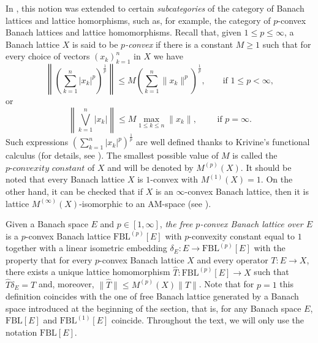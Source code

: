 \documentclass[11pt]{amsart}
\theoremstyle{definition}
\numberwithin{equation}{section}
\newcommand{\fbl}{\text{FBL}}
\begin{document}
In \cite{JLTTT}, this notion was extended to certain \textit{subcategories} of the category of Banach lattices and lattice homorphisms, such as, for example, the category of $p$-convex Banach lattices and lattice homomorphisms. Recall that, given $1\leq p\leq \infty$, a Banach lattice $X$ is said to be \emph{$p$-convex} if there is a constant $M\geq 1$ such that for every choice of vectors $(x_k)_{k=1}^n$ in $X$ we have
$$
\left\|\left(\sum_{k=1}^n|x_k|^p\right)^{\frac{1}{p}}\right\|\leq M\left(\sum_{k=1}^n\|x_k\|^p\right)^{\frac{1}{p}}, \qquad \text{if } 1\leq p<\infty,
$$
or
$$
\left\|\bigvee_{k=1}^n |x_k| \right\|\leq M \max_{1\leq k\leq n} \|x_k\|, \qquad \text{ if } p=\infty.
$$
Such expressions $\left(\sum_{k=1}^n|x_k|^p\right)^{\frac{1}{p}}$ are well defined thanks to Krivine's functional calculus (for details, see \cite[Section 1.d]{LT2-book}). The smallest possible value of $M$ is called the $\textit{$p$-convexity constant}$ of $X$ and will be denoted by $M^{(p)}(X)$. It should be noted that every Banach lattice $X$ is $1$-convex with $M^{(1)}(X)=1$. On the other hand, it can be checked that if $X$ is an $\infty$-convex Banach lattice, then it is lattice $M^{(\infty)}(X)$-isomorphic to an AM-space (see \cite[Theorem 2.1.12]{M-N-book}).  


Given a Banach space $E$ and $p\in[1,\infty]$, \textit{the free $p$-convex Banach lattice over $E$} is a $p$-convex Banach lattice $\fbl^{(p)}[E]$ with $p$-convexity constant equal to $1$ together with a linear isometric embedding $\delta_E:E\to \fbl^{(p)}[E]$ with the property that for every $p$-convex Banach lattice $X$ and every operator $T:E\to X$, there exists a unique lattice homomorphism $\widehat{T}:\fbl^{(p)}[E]\to X$ such that $\widehat{T}\delta_E=T$ and, moreover, $\|\widehat{T}\|\leq M^{(p)}(X)\|T\|$. Note that for $p=1$ this definition coincides with the one of free Banach lattice generated by a Banach space introduced at the beginning of the section, that is, for any Banach space $E$, $\fbl[E]$ and $\fbl^{(1)}[E]$ coincide. Throughout the text, we will only use the notation $\fbl[E]$. 
\end{document}
